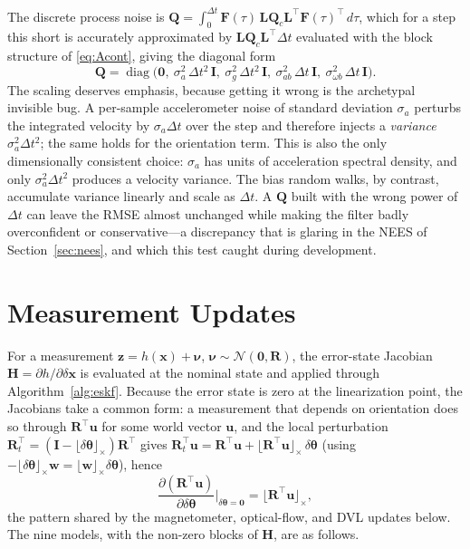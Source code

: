 \documentclass[11pt]{article}
\newcommand{\R}{\mathbf{R}}
\newcommand{\I}{\mathbf{I}}
\newcommand{\bH}{\mathbf{H}}
\newcommand{\bF}{\mathbf{F}}
\newcommand{\bQ}{\mathbf{Q}}
\newcommand{\bz}{\mathbf{z}}
\newcommand{\bx}{\mathbf{x}}
\newcommand{\bL}{\mathbf{L}}
\newcommand{\bnu}{\bm{\nu}}
\newcommand{\skewm}[1]{\lfloor #1 \rfloor_\times}
\newcommand{\dtheta}{\delta\bm{\theta}}
\newcommand{\dx}{\delta\bx}
\DeclareMathOperator{\diag}{diag}
\begin{document}
The discrete process noise is $\bQ = \int_0^{\Delta t}\!\bF(\tau)\,\bL\bQ_c\bL^{\!\top}\bF(\tau)^{\!\top}\,d\tau$,
which for a step this short is accurately approximated by $\bL\bQ_c\bL^{\!\top}\Delta t$ evaluated with
the block structure of \eqref{eq:Acont}, giving the diagonal form
\begin{equation}
  \bQ = \diag\!\big(\mathbf{0},\ \sigma_a^2\,\Delta t^2\,\I,\ \sigma_g^2\,\Delta t^2\,\I,\
  \sigma_{ab}^2\,\Delta t\,\I,\ \sigma_{\omega b}^2\,\Delta t\,\I\big).
  \label{eq:Q}
\end{equation}
The scaling deserves emphasis, because getting it wrong is the archetypal invisible bug. A per-sample
accelerometer noise of standard deviation $\sigma_a$ perturbs the integrated velocity by
$\sigma_a\Delta t$ over the step and therefore injects a \emph{variance} $\sigma_a^2\Delta t^2$; the
same holds for the orientation term. This is also the only dimensionally consistent choice: $\sigma_a$
has units of acceleration spectral density, and only $\sigma_a^2\Delta t^2$ produces a velocity
variance. The bias random walks, by contrast, accumulate variance linearly and scale as $\Delta t$. A
$\bQ$ built with the wrong power of $\Delta t$ can leave the RMSE almost unchanged while making the
filter badly overconfident or conservative---a discrepancy that is glaring in the NEES of
Section~\ref{sec:nees}, and which this test caught during development.

\section{Measurement Updates}
\label{sec:meas}

For a measurement $\bz = h(\bx) + \bnu$, $\bnu\sim\mathcal{N}(\mathbf 0,\mathbf{R})$, the error-state
Jacobian $\bH = \partial h / \partial \dx$ is evaluated at the nominal state and applied through
Algorithm~\ref{alg:eskf}. Because the error state is zero at the linearization point, the Jacobians
take a common form: a measurement that depends on orientation does so through $\R^\top\bm u$ for some
world vector $\bm u$, and the local perturbation $\R_t^\top = (\I-\skewm{\dtheta})\R^\top$ gives
$\R_t^\top\bm u = \R^\top\bm u + \skewm{\R^\top\bm u}\,\dtheta$ (using $-\skewm{\dtheta}\bm w =
\skewm{\bm w}\dtheta$), hence
\begin{equation}
  \frac{\partial (\R^\top\bm u)}{\partial\dtheta}\bigg|_{\dtheta=\mathbf 0} = \skewm{\R^\top\bm u},
  \label{eq:rotjac}
\end{equation}
the pattern shared by the magnetometer, optical-flow, and DVL updates below. The nine models, with the
non-zero blocks of $\bH$, are as follows.
\end{document}
